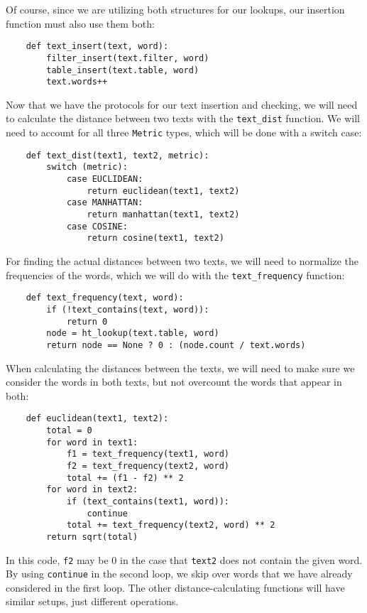\documentclass[12pt]{article}
\begin{document}
Of course, since we are utilizing both structures for our lookups, our insertion function must also use them both:
\begin{verbatim}
    def text_insert(text, word):
        filter_insert(text.filter, word)
        table_insert(text.table, word)
        text.words++
\end{verbatim}
Now that we have the protocols for our text insertion and checking, we will need to calculate the distance between two texts with the \verb|text_dist| function. We will need to account for all three \verb|Metric| types, which will be done with a switch case:
\begin{verbatim}
    def text_dist(text1, text2, metric):
        switch (metric):
            case EUCLIDEAN:
                return euclidean(text1, text2)
            case MANHATTAN:
                return manhattan(text1, text2)
            case COSINE:
                return cosine(text1, text2)
\end{verbatim}
For finding the actual distances between two texts, we will need to normalize the frequencies of the words, which we will do with the \verb|text_frequency| function:
\begin{verbatim}
    def text_frequency(text, word):
        if (!text_contains(text, word)):
            return 0
        node = ht_lookup(text.table, word)
        return node == None ? 0 : (node.count / text.words)
\end{verbatim}
When calculating the distances between the texts, we will need to make sure we consider the words in both texts, but not overcount the words that appear in both:
\begin{verbatim}
    def euclidean(text1, text2):
        total = 0
        for word in text1:
            f1 = text_frequency(text1, word)
            f2 = text_frequency(text2, word)
            total += (f1 - f2) ** 2
        for word in text2:
            if (text_contains(text1, word)):
                continue
            total += text_frequency(text2, word) ** 2
        return sqrt(total)
\end{verbatim}
In this code, \verb|f2| may be $0$ in the case that \verb|text2| does not contain the given word. By using \verb|continue| in the second loop, we skip over words that we have already considered in the first loop. The other distance-calculating functions will have similar setups, just different operations.
\end{document}
